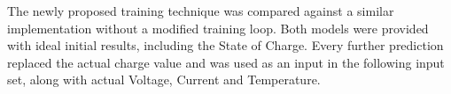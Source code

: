 The newly proposed training technique was compared against a similar implementation without a modified training loop.
Both models were provided with ideal initial results, including the State of Charge.
Every further prediction replaced the actual charge value and was used as an input in the following input set, along with actual Voltage, Current and Temperature.
{    


}
